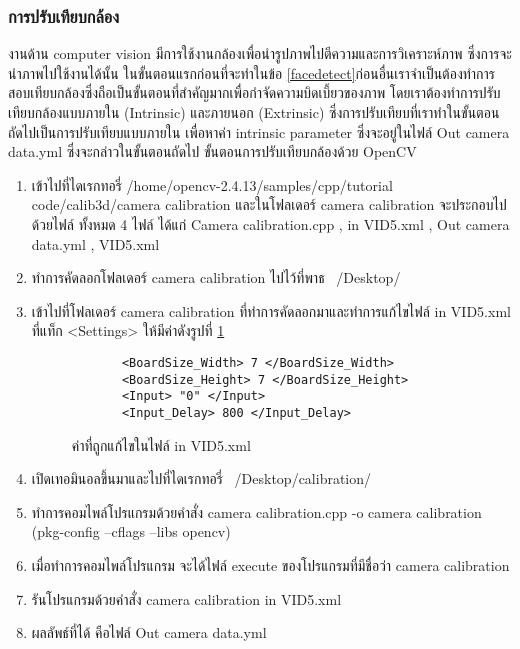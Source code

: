   \subsubsection{การปรับเทียบกล้อง}
  งานด้าน computer vision มีการใช้งานกล้องเพื่อนำรูปภาพไปตีความและการวิเคราะห์ภาพ ซึ่งการจะนำภาพไปใช้งานได้นั้น ในขั้นตอนแรกก่อนที่จะทำในข้อ \ref{facedetect}ก่อนอื่นเราจำเป็นต้องทำการสอบเทียบกล้องซึ่งถือเป็นขั้นตอนที่สำคัญมากเพื่อกำจัดความบิดเบี้ยวของภาพ โดยเราต้องทำการปรับเทียบกล้องแบบภายใน (Intrinsic) และภายนอก (Extrinsic) ซึ่งการปรับเทียบที่เราทำในขั้นตอนถัดไปเป็นการปรับเทียบแบบภายใน เพื่อหาค่า intrinsic parameter ซึ่งจะอยู่ในไฟล์ Out camera data.yml ซึ่งจะกล่าวในขั้นตอนถัดไป
  ขั้นตอนการปรับเทียบกล้องด้วย OpenCV
  \begin{enumerate}
  \item เข้าไปที่ไดเรกทอรี่ /home/opencv-2.4.13/samples/cpp/tutorial code/calib3d/camera calibration  และในโฟลเดอร์ camera calibration จะประกอบไปด้วยไฟล์ ทั้งหมด 4 ไฟล์ ได้แก่ Camera calibration.cpp , in VID5.xml , Out camera data.yml , VID5.xml 
  \item ทำการคัดลอกโฟลเดอร์ camera calibration ไปไว้ที่พาธ ~/Desktop/
  \item เข้าไปที่โฟลเดอร์ camera calibration ที่ทำการคัดลอกมาและทำการแก้ไขไฟล์ in VID5.xml ที่แท็ก <Settings> ให้มีค่าดังรูปที่ \ref{calibration1}
       \begin{figure}[t]
\begin{lstlisting}
       <BoardSize_Width> 7 </BoardSize_Width>
       <BoardSize_Height> 7 </BoardSize_Height>
       <Input> "0" </Input>
       <Input_Delay> 800 </Input_Delay>	
\end{lstlisting}
\caption{ค่าที่ถูกแก้ไขในไฟล์ in VID5.xml }
\label{calibration1}
\hrulefill
       \end{figure}
     \item เปิดเทอมินอลขึ้นมาและไปที่ไดเรกทอรี่ ~/Desktop/calibration/
     \item ทำการคอมไพล์โปรแกรมด้วยคำสั่ง
        camera calibration.cpp -o camera calibration (pkg-config --cflags --libs opencv)
     \item เมื่อทำการคอมไพล์โปรแกรม จะได้ไฟล์ execute ของโปรแกรมที่มีชื่อว่า
       camera calibration
     \item รันโปรแกรมด้วยคำสั่ง
       camera calibration in VID5.xml
     \item ผลลัพธ์ที่ได้ คือไฟล์ Out
       camera data.yml
 \end{enumerate}

\subsubsection{}
\subsubsection{}